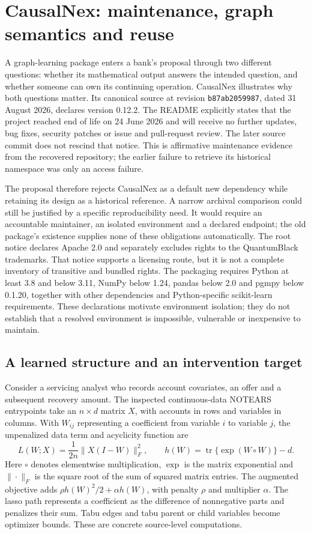 \section{CausalNex: maintenance, graph semantics and reuse}
\label{exec14:causalnex}

A graph-learning package enters a bank's proposal through two different
questions: whether its mathematical output answers the intended question, and
whether someone can own its continuing operation. CausalNex illustrates why
both questions matter. Its canonical source at revision
\texttt{b87ab2059987}, dated 31 August 2026, declares version 0.12.2. The README
explicitly states that the project reached end of life on 24 June 2026 and
will receive no further updates, bug fixes, security patches or issue and
pull-request review. The later source commit does not rescind that notice.
This is affirmative maintenance evidence from the recovered repository; the
earlier failure to retrieve its historical namespace was only an access
failure.~\citep{exec14_causalnex_primary}

The proposal therefore rejects CausalNex as a default new dependency while
retaining its design as a historical reference. A narrow archival comparison
could still be justified by a specific reproducibility need. It would require
an accountable maintainer, an isolated environment and a declared endpoint;
the old package's existence supplies none of these obligations automatically.
The root notice declares Apache 2.0 and separately excludes rights to the
QuantumBlack trademarks. That notice supports a licensing route, but it is
not a complete inventory of transitive and bundled rights. The packaging
requires Python at least 3.8 and below 3.11, NumPy below 1.24, pandas below 2.0
and pgmpy below 0.1.20, together with other dependencies and Python-specific
scikit-learn requirements. These declarations motivate environment isolation;
they do not establish that a resolved environment is impossible, vulnerable
or inexpensive to maintain.~\citep{exec14_causalnex_primary}

\subsection{A learned structure and an intervention target}

Consider a servicing analyst who records account covariates, an offer and a
subsequent recovery amount. The inspected continuous-data NOTEARS entrypoints
take an $n\times d$ matrix $X$, with accounts in rows and variables in columns.
With $W_{ij}$ representing a coefficient from variable $i$ to variable $j$,
the unpenalized data term and acyclicity function are
\[
 L(W;X)=\frac{1}{2n}\|X(I-W)\|_F^2,
 \qquad h(W)=\operatorname{tr}\{\exp(W\circ W)\}-d.
\]
Here $\circ$ denotes elementwise multiplication, $\exp$ is the matrix
exponential and $\|\cdot\|_F$ is the square root of the sum of squared matrix
entries. The augmented objective adds $\rho h(W)^2/2+\alpha h(W)$, with
penalty $\rho$ and multiplier $\alpha$. The lasso path represents a coefficient
as the difference of nonnegative parts and penalizes their sum. Tabu edges and
tabu parent or child variables become optimizer bounds. These are concrete
source-level computations.~\citep{exec14_causalnex_primary}

